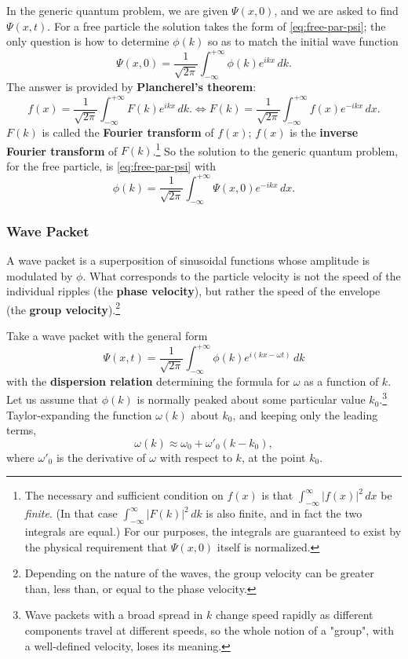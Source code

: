 \documentclass{article}
\begin{document}
In the generic quantum problem, we are given $\Psi(x, 0)$, and we are asked to
find $\Psi(x, t)$. For a free particle the solution takes the form of
\eqref{eq:free-par-psi}; the only question is how to determine $\phi(k)$ so as
to match the initial wave function \[
  \Psi(x, 0)
  = \frac{1}{\sqrt{2\pi}}\int_{-\infty}^{+\infty} \phi(k)e^{ikx} \,dk.
\] The answer is provided by \textbf{Plancherel's theorem}:
\begin{equation} \label{eq:plan-thm}
  f(x) = \frac{1}{\sqrt{2\pi}}\int_{-\infty}^{+\infty} F(k)e^{ikx} \,dk.
  \iff
  F(k) = \frac{1}{\sqrt{2\pi}}\int_{-\infty}^{+\infty} f(x)e^{-ikx} \,dx.
\end{equation}
$F(k)$ is called the \textbf{Fourier transform} of $f(x)$; $f(x)$ is the
\textbf{inverse Fourier transform} of $F(k)$.\footnote{The necessary and
sufficient condition on $f(x)$ is that $\int_{-\infty}^{\infty} |f(x)|^2 \,dx$
be \emph{finite}. (In that case $\int_{-\infty}^{\infty} |F(k)|^2 \,dk$ is also
finite, and in fact the two integrals are equal.) For our purposes, the
integrals are guaranteed to exist by the physical requirement that $\Psi(x, 0)$
itself is normalized.} So the solution to the generic quantum problem, for the free
particle, is \eqref{eq:free-par-psi} with
\begin{equation} \label{eq:free-par-phi}
  \boxed{
    \phi(k)
    = \frac{1}{\sqrt{2\pi}}\int_{-\infty}^{+\infty}
      \Psi(x, 0)e^{-ikx}
    \,dx.
  }
\end{equation}

\subsubsection{Wave Packet}

A wave packet is a superposition of sinusoidal functions whose amplitude is
modulated by $\phi$. What corresponds to the particle velocity is not the
speed of the individual ripples (the \textbf{phase velocity}), but rather the
speed of the envelope (the \textbf{group velocity}).\footnote{Depending on the
nature of the waves, the group velocity can be greater than, less than, or
equal to the phase velocity.}

Take a wave packet with the general form \[
  \Psi(x, t) = \frac{1}{\sqrt{2\pi}}\int_{-\infty}^{+\infty}
    \phi(k)e^{i(kx - \omega t)}
  \,dk
\] with the \textbf{dispersion relation} determining the formula for $\omega$
as a function of $k$. Let us assume that $\phi(k)$ is normally peaked about
some particular value $k_0$.\footnote{Wave packets with a broad spread in $k$
change speed rapidly as different components travel at different speeds, so the
whole notion of a "group", with a well-defined velocity, loses its meaning.}
Taylor-expanding the function $\omega(k)$ about $k_0$, and keeping only the
leading terms, \[ \omega(k) \approx \omega_0 + \omega'_0(k - k_0), \] where
$\omega'_0$ is the derivative of $\omega$ with respect to $k$, at the point
$k_0$.
\end{document}
